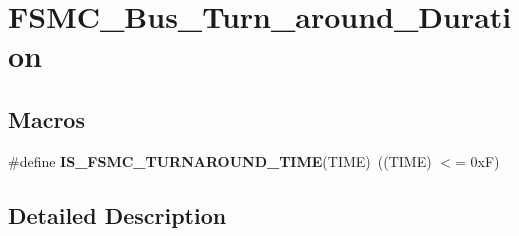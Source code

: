 \hypertarget{group___f_s_m_c___bus___turn__around___duration}{}\section{F\+S\+M\+C\+\_\+\+Bus\+\_\+\+Turn\+\_\+around\+\_\+\+Duration}
\label{group___f_s_m_c___bus___turn__around___duration}
\subsection*{Macros}
\begin{DoxyCompactItemize}
\item 
\hypertarget{group___f_s_m_c___bus___turn__around___duration_ga9ec626f30679a18af91bf48c52d9260d}{}\#define {\bfseries I\+S\+\_\+\+F\+S\+M\+C\+\_\+\+T\+U\+R\+N\+A\+R\+O\+U\+N\+D\+\_\+\+T\+I\+M\+E}(T\+I\+M\+E)~((T\+I\+M\+E) $<$= 0x\+F)\label{group___f_s_m_c___bus___turn__around___duration_ga9ec626f30679a18af91bf48c52d9260d}

\end{DoxyCompactItemize}


\subsection{Detailed Description}
